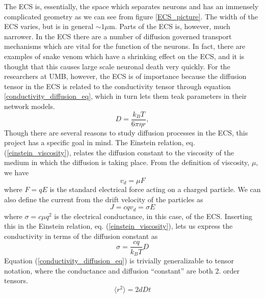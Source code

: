 The ECS is, essentially, the space which separates neurons and has an immensely complicated geometry as we can see from figure \ref{ECS_picture}. 
The width of the ECS varies, but is in general $\sim1\mu$m. 
Parts of the ECS is, however, much narrower. In the ECS there are a number of diffusion governed transport mechanisms which are vital for the function of the neurons. 
In fact, there are examples of snake venom which have a shrinking effect on the ECS, and it is thought that this causes large scale neuronal death very quickly. 
For the researchers at UMB, however, the ECS is of importance because the diffusion tensor in the ECS is related to the conductivity tensor through equation \ref{conductivity_diffusion_eq}, which in turn lets them teak parameters in their network models. \\
\begin{equation}\label{einstein_viscosity}
D = \frac{k_B T}{6\pi \eta r},
\end{equation}
Though there are several reasons to study diffusion processes in the ECS, this project has a specific goal in mind. 
The Einstein relation, eq. (\ref{einstein_viscosity}), relates the diffusion constant to the viscosity of the medium in which the diffusion is taking place. 
From the definition of viscosity, $\mu$, we have 
\begin{equation}
v_d = \mu F 
\end{equation}
where $F = qE$ is the standard electrical force acting on a charged particle. 
We can also define the current from the drift velocity of the particles as 
\begin{equation}
J = cqv_d = \sigma E 
\end{equation}
where $\sigma = c\mu q^2$ is the electrical conductance, in this case, of the ECS. 
Inserting this in the Einstein relation, eq. (\ref{einstein_viscosity}), lets us express the conductivity in terms of the diffusion constant as 
\begin{equation}\label{conductivity_diffusion_eq}
\sigma = \frac{cq}{k_B T}D 
\end{equation}
Equation (\ref{conductivity_diffusion_eq}) is trivially generalizable to tensor notation, where the conductance and diffusion ``constant'' are both 2. order tensors.\\

\begin{equation}\label{stochastic_einstein}
\langle r^2\rangle = 2dDt 
\end{equation}

